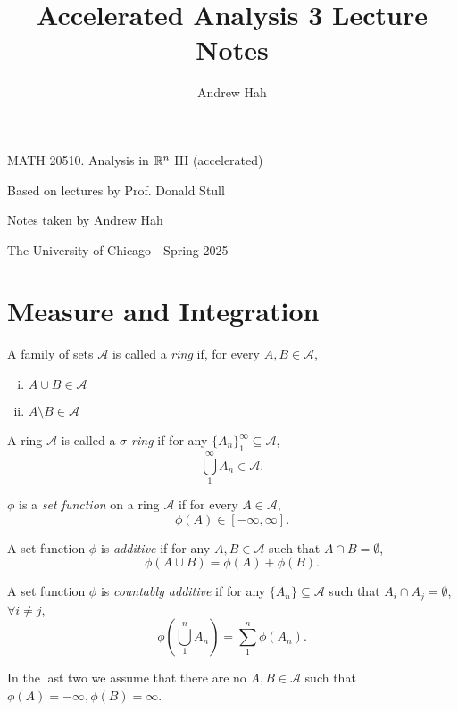 \documentclass[11pt]{article}
\title{Accelerated Analysis 3 Lecture Notes}
\author{Andrew Hah}
\begin{document}
\thispagestyle{empty}  %

\begin{center}
  {\Large MATH 20510. Analysis in $\mathbb{R}^{n}$ III (accelerated)}\par
  \vspace{3ex}
  {\large Based on lectures by Prof. Donald Stull}\par
  {\normalsize Notes taken by Andrew Hah}\par
  \vspace{2ex}
  {\small The University of Chicago - Spring 2025}
\end{center}

\tableofcontents

\section{Measure and Integration}

\begin{definition}
    A family of sets $\mathscr{A}$ is called a \emph{ring} if, for every $A, B \in \mathscr{A}$, \begin{enumerate} [(i), nosep, left=0pt]
        \item $A \cup B \in \mathscr{A}$
        \item $A \setminus B \in \mathscr{A}$
    \end{enumerate}
\end{definition}

\begin{definition}
    A ring $\mathscr{A}$ is called a \emph{$\sigma$-ring} if for any $\{ A_n \}_1^\infty \subseteq \mathscr{A}$, $$\bigcup_1^\infty A_n \in \mathscr{A}.$$
\end{definition}

\begin{definition}
    $\phi$ is a \emph{set function} on a ring $\mathscr{A}$ if for every $A \in \mathscr{A}$, $$\phi(A) \in [-\infty, \infty].$$
\end{definition}

\begin{definition}
    A set function $\phi$ is \emph{additive} if for any $A, B \in \mathscr{A}$ such that $A \cap B = \emptyset$, $$\phi(A \cup B) = \phi(A) + \phi(B).$$
\end{definition}

\begin{definition}
    A set function $\phi$ is \emph{countably additive} if for any $\{ A_n \} \subseteq \mathscr{A}$ such that $A_i \cap A_j = \emptyset$, $\forall i \neq j$, $$\phi \left( \bigcup_1^n A_n \right) = \sum_1^n \phi(A_n).$$
\end{definition}
In the last two we assume that there are no $A, B \in \mathscr{A}$ such that $\phi(A) = -\infty, \phi(B) = \infty$. 
\end{document}
